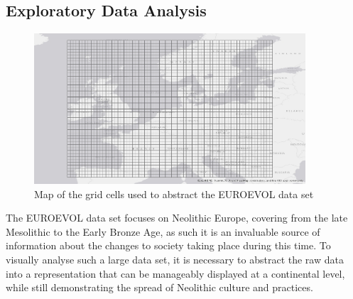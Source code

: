\subsection{Exploratory Data Analysis}

\begin{figure}
\begin{center}
	\includegraphics[width=0.9\textwidth]{figures/grid}
\end{center}
  \caption{Map of the grid cells used to abstract the EUROEVOL data set}
  \label{fig:grid}
\end{figure}

The EUROEVOL data set focuses on Neolithic Europe, covering from the late Mesolithic to the Early Bronze Age, as such it is an invaluable source of information about the changes to society taking place during this time. To visually analyse such a large data set, it is necessary to abstract the raw data into a representation that can be manageably displayed at a continental level, while still demonstrating the spread of Neolithic culture and practices. 

